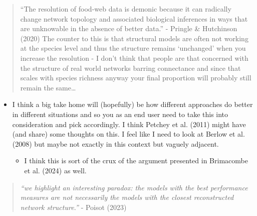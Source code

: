 \documentclass[
]{article}
\providecommand{\tightlist}{%
  \setlength{\itemsep}{0pt}\setlength{\parskip}{0pt}}\usepackage{longtable,booktabs,array}
\begin{document}
\begin{quote}
``The resolution of food-web data is demonic because it can radically
change network topology and associated biological inferences in ways
that are unknowable in the absence of better data.'' - Pringle \&
Hutchinson (2020) The counter to this is that structural models are
often not working at the species level and thus the structure remains
`unchanged' when you increase the resolution - I don't think that people
are that concerned with the structure of real world networks barring
connectance and since that scales with species richness anyway your
final proportion will probably still remain the same\ldots{}
\end{quote}

\begin{itemize}
\item
  I think a big take home will (hopefully) be how different approaches
  do better in different situations and so you as an end user need to
  take this into consideration and pick accordingly. I think Petchey et
  al. (2011) might have (and share) some thoughts on this. I feel like I
  need to look at Berlow et al. (2008) but maybe not exactly in this
  context but vaguely adjacent.

  \begin{itemize}
  \tightlist
  \item
    I think this is sort of the crux of the argument presented in
    Brimacombe et al. (2024) as well.
  \end{itemize}
\end{itemize}

\begin{quote}
\emph{``we highlight an interesting paradox: the models with the best
performance measures are not necessarily the models with the closest
reconstructed network structure.''} - Poisot (2023)
\end{quote}
\end{document}
